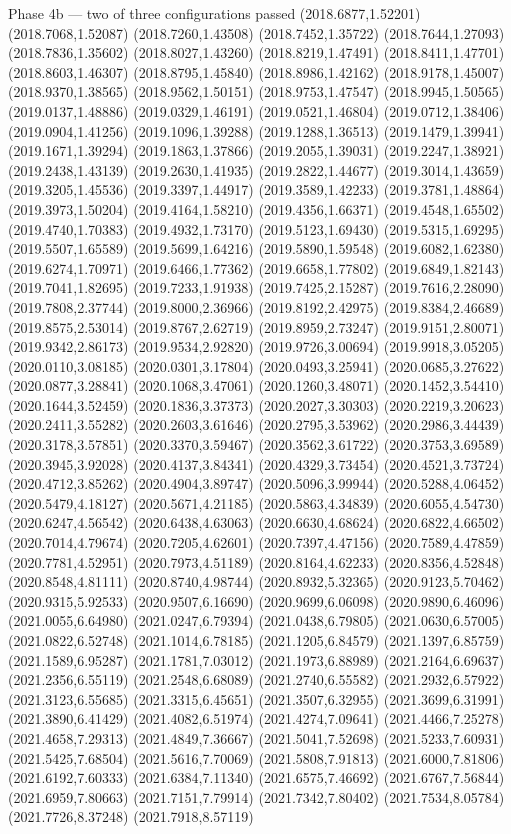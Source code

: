 \documentclass[aspectratio=169,10pt]{beamer}
\begin{document}
\begin{frame}[t]{Phase 4b — two of three configurations passed}
(2018.6877,1.52201) (2018.7068,1.52087) (2018.7260,1.43508) (2018.7452,1.35722) (2018.7644,1.27093) (2018.7836,1.35602) (2018.8027,1.43260) (2018.8219,1.47491) (2018.8411,1.47701) (2018.8603,1.46307) (2018.8795,1.45840) (2018.8986,1.42162) (2018.9178,1.45007) (2018.9370,1.38565) (2018.9562,1.50151) (2018.9753,1.47547) (2018.9945,1.50565) (2019.0137,1.48886) (2019.0329,1.46191) (2019.0521,1.46804) (2019.0712,1.38406) (2019.0904,1.41256) (2019.1096,1.39288) (2019.1288,1.36513) (2019.1479,1.39941) (2019.1671,1.39294) (2019.1863,1.37866) (2019.2055,1.39031) (2019.2247,1.38921) (2019.2438,1.43139) (2019.2630,1.41935) (2019.2822,1.44677) (2019.3014,1.43659) (2019.3205,1.45536) (2019.3397,1.44917) (2019.3589,1.42233) (2019.3781,1.48864) (2019.3973,1.50204) (2019.4164,1.58210) (2019.4356,1.66371) (2019.4548,1.65502) (2019.4740,1.70383) (2019.4932,1.73170) (2019.5123,1.69430) (2019.5315,1.69295) (2019.5507,1.65589) (2019.5699,1.64216) (2019.5890,1.59548) (2019.6082,1.62380) (2019.6274,1.70971) (2019.6466,1.77362) (2019.6658,1.77802) (2019.6849,1.82143) (2019.7041,1.82695) (2019.7233,1.91938) (2019.7425,2.15287) (2019.7616,2.28090) (2019.7808,2.37744) (2019.8000,2.36966) (2019.8192,2.42975) (2019.8384,2.46689) (2019.8575,2.53014) (2019.8767,2.62719) (2019.8959,2.73247) (2019.9151,2.80071) (2019.9342,2.86173) (2019.9534,2.92820) (2019.9726,3.00694) (2019.9918,3.05205) (2020.0110,3.08185) (2020.0301,3.17804) (2020.0493,3.25941) (2020.0685,3.27622) (2020.0877,3.28841) (2020.1068,3.47061) (2020.1260,3.48071) (2020.1452,3.54410) (2020.1644,3.52459) (2020.1836,3.37373) (2020.2027,3.30303) (2020.2219,3.20623) (2020.2411,3.55282) (2020.2603,3.61646) (2020.2795,3.53962) (2020.2986,3.44439) (2020.3178,3.57851) (2020.3370,3.59467) (2020.3562,3.61722) (2020.3753,3.69589) (2020.3945,3.92028) (2020.4137,3.84341) (2020.4329,3.73454) (2020.4521,3.73724) (2020.4712,3.85262) (2020.4904,3.89747) (2020.5096,3.99944) (2020.5288,4.06452) (2020.5479,4.18127) (2020.5671,4.21185) (2020.5863,4.34839) (2020.6055,4.54730) (2020.6247,4.56542) (2020.6438,4.63063) (2020.6630,4.68624) (2020.6822,4.66502) (2020.7014,4.79674) (2020.7205,4.62601) (2020.7397,4.47156) (2020.7589,4.47859) (2020.7781,4.52951) (2020.7973,4.51189) (2020.8164,4.62233) (2020.8356,4.52848) (2020.8548,4.81111) (2020.8740,4.98744) (2020.8932,5.32365) (2020.9123,5.70462) (2020.9315,5.92533) (2020.9507,6.16690) (2020.9699,6.06098) (2020.9890,6.46096) (2021.0055,6.64980) (2021.0247,6.79394) (2021.0438,6.79805) (2021.0630,6.57005) (2021.0822,6.52748) (2021.1014,6.78185) (2021.1205,6.84579) (2021.1397,6.85759) (2021.1589,6.95287) (2021.1781,7.03012) (2021.1973,6.88989) (2021.2164,6.69637) (2021.2356,6.55119) (2021.2548,6.68089) (2021.2740,6.55582) (2021.2932,6.57922) (2021.3123,6.55685) (2021.3315,6.45651) (2021.3507,6.32955) (2021.3699,6.31991) (2021.3890,6.41429) (2021.4082,6.51974) (2021.4274,7.09641) (2021.4466,7.25278) (2021.4658,7.29313) (2021.4849,7.36667) (2021.5041,7.52698) (2021.5233,7.60931) (2021.5425,7.68504) (2021.5616,7.70069) (2021.5808,7.91813) (2021.6000,7.81806) (2021.6192,7.60333) (2021.6384,7.11340) (2021.6575,7.46692) (2021.6767,7.56844) (2021.6959,7.80663) (2021.7151,7.79914) (2021.7342,7.80402) (2021.7534,8.05784) (2021.7726,8.37248) (2021.7918,8.57119) 
\end{frame}
\end{document}

